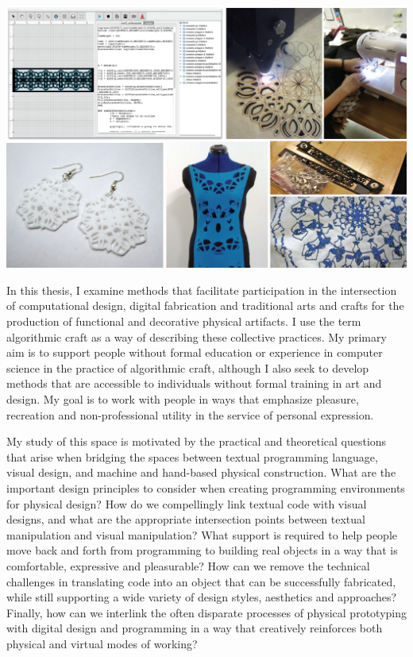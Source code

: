  \begin{center}
\includegraphics[width=\columnwidth]{images/intro_pic.jpg}
\end{center}

In this thesis, I examine methods that facilitate participation in the intersection of computational design, digital fabrication and traditional arts and crafts for the production of functional and decorative physical artifacts. I use the term algorithmic craft as a way of describing these collective practices. My primary aim is to support people without formal education or experience in computer science in the practice of algorithmic craft, although I also seek to develop methods that are accessible to individuals without formal training in art and design. My goal is to work with people in ways that emphasize pleasure, recreation and non-professional utility in the service of personal expression. 

My study of this space is motivated by the practical and theoretical questions that arise when bridging the spaces between textual programming language, visual design, and machine and hand-based physical construction. What are the important design principles to consider when creating  programming environments for physical design? How do we compellingly link textual code with visual designs, and what are the appropriate intersection points between textual manipulation and visual manipulation? What support is required to help people move back and forth from programming to building real objects in a way that is comfortable, expressive and pleasurable? How can we remove the technical challenges in translating code into an object that can be successfully fabricated, while still supporting a wide variety of design styles, aesthetics and approaches? Finally, how can we interlink the often disparate processes of physical prototyping with digital design and programming in a way that creatively reinforces both physical and virtual modes of working?

